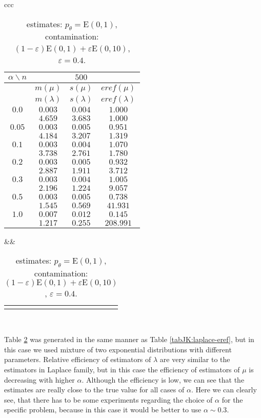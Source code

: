 {\begin{table}[htb] \footnotesize
\begin{center}
\begin{tabular}{ccc}
	\begin{tabular}{|c|ccc|}
	\hline
	$\alpha\backslash n$ && $500$ & \\
	\hline
	& $m(\mu)$ & $s(\mu)$ & $eref(\mu)$ \\
	& $m(\lambda)$ & $s(\lambda)$ & $eref(\lambda)$ \\
	\hline
	$0.0$ & $ 0.003 $ & $ 0.004 $ & $ 1.000 $\\
	 & $ 4.659 $ & $ 3.683 $ & $ 1.000 $\\
	\hline
	$0.05$ & $ 0.003 $ & $ 0.005 $ & $ 0.951 $\\
	 & $ 4.184 $ & $ 3.207 $ & $ 1.319 $\\
	\hline
	$0.1$ & $ 0.003 $ & $ 0.004 $ & $ 1.070 $\\
	 & $ 3.738 $ & $ 2.761 $ & $ 1.780 $\\
	\hline
	$0.2$ & $ 0.003 $ & $ 0.005 $ & $ 0.932 $\\
	 & $ 2.887 $ & $ 1.911 $ & $ 3.712 $\\
	\hline
	$0.3$ & $ 0.003 $ & $ 0.004 $ & $ 1.005 $\\
	 & $ 2.196 $ & $ 1.224 $ & $ 9.057 $\\
	\hline
	$0.5$ & $ 0.003 $ & $ 0.005 $ & $ 0.738 $\\
	 & $ 1.545 $ & $ 0.569 $ & $ 41.931 $\\
	\hline
	$1.0$ & $ 0.007 $ & $ 0.012 $ & $ 0.145 $\\
	 & $ 1.217 $ & $ 0.255 $ & $ 208.991 $\\
	\hline
	\end{tabular}
&&
	\begin{tabular}{c}
		\epsfig{file=Exp-e04-eref.eps, height=2.5in}
	\end{tabular}
\\
\end{tabular}
\end{center}
\caption{\R estimates: $p_\theta = \mathrm{E}(0,1)$, contamination: $(1-\varepsilon)\mathrm{E}(0,1) + \varepsilon \mathrm{E}(0,10)$, $\varepsilon =  0.4$.}
\label{tabJK:exponential-eref}
\end{table}

\noindent Table \ref{tabJK:exponential-eref} was generated in the same manner as Table \ref{tabJK:laplace-eref}, but in this case we used mixture of two exponential distributions with different parameters. Relative efficiency of estimators of $\lambda$ are very similar to the estimators in Laplace family, but in this case the efficiency of estimators of $\mu$ is decreasing with higher $\alpha$. Although the efficiency is low, we can see that the estimates are really close to the true value for all cases of $\alpha$. Here we can clearly see, that there has to be some experiments regarding the choice of $\alpha$ for the specific problem, because in this case it would be better to use $\alpha \sim 0.3$.

}
